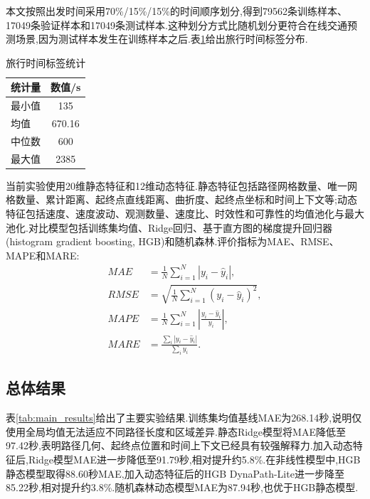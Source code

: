 \documentclass{rjthesis}
\begin{document}
本文按照出发时间采用70\%/15\%/15\%的时间顺序划分,得到79562条训练样本、17049条验证样本和17049条测试样本.这种划分方式比随机划分更符合在线交通预测场景,因为测试样本发生在训练样本之后.表\ref{tab:target_stats}给出旅行时间标签分布.

\begin{table}[htbp]
	\centering
	\caption{旅行时间标签统计}
	\label{tab:target_stats}
	\begin{tabular}{lc}
		\toprule
		统计量 & 数值/s \\
		\midrule
		最小值 & 135 \\
		均值 & 670.16 \\
		中位数 & 600 \\
		最大值 & 2385 \\
		\bottomrule
	\end{tabular}
\end{table}

当前实验使用20维静态特征和12维动态特征.静态特征包括路径网格数量、唯一网格数量、累计距离、起终点直线距离、曲折度、起终点坐标和时间上下文等;动态特征包括速度、速度波动、观测数量、速度比、时效性和可靠性的均值池化与最大池化.对比模型包括训练集均值、Ridge回归、基于直方图的梯度提升回归器(histogram gradient boosting, HGB)和随机森林.评价指标为MAE、RMSE、MAPE和MARE:
\begin{align}
	MAE&=\frac{1}{N}\sum_{i=1}^{N}|y_i-\hat{y}_i|,\\
	RMSE&=\sqrt{\frac{1}{N}\sum_{i=1}^{N}(y_i-\hat{y}_i)^2},\\
	MAPE&=\frac{1}{N}\sum_{i=1}^{N}\left|\frac{y_i-\hat{y}_i}{y_i}\right|,\\
	MARE&=\frac{\sum_i |y_i-\hat{y}_i|}{\sum_i y_i}.
\end{align}

\subsection{总体结果}

表\ref{tab:main_results}给出了主要实验结果.训练集均值基线MAE为268.14秒,说明仅使用全局均值无法适应不同路径长度和区域差异.静态Ridge模型将MAE降低至97.42秒,表明路径几何、起终点位置和时间上下文已经具有较强解释力.加入动态特征后,Ridge模型MAE进一步降低至91.79秒,相对提升约5.8\%.在非线性模型中,HGB静态模型取得88.60秒MAE,加入动态特征后的HGB DynaPath-Lite进一步降至85.22秒,相对提升约3.8\%.随机森林动态模型MAE为87.94秒,也优于HGB静态模型.
\end{document}
